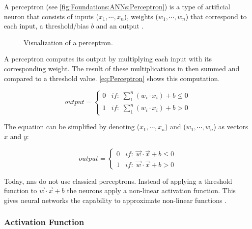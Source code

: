 A perceptron (see \autoref{fig:Foundations:ANNs:Perceptron}) is a type of artificial neuron that consists of inputs ($x_1, \cdots, x_n$), weights ($w_1, \cdots, w_n$) that correspond to each input, a threshold/bias $b$ and an output \cite{nielsen2015neural}.

\begin{figure}
    \centering
    \caption{Visualization of a perceptron.}
    \label{fig:Foundations:ANNs:Perceptron}
\end{figure}

A perceptron computes its output by multiplying each input with its corresponding weight. The result of these multiplications in then summed and compared to a threshold value. \autoref{eq:Perceptron} shows this computation.

\begin{equation}
    output = 
    \begin{cases}\label{eq:Perceptron}
    0 & if:\; \sum_{1}^{n}(w_i \cdot x_i) + b \le 0 \\
    1 & if:\; \sum_{1}^{n}(w_i \cdot x_i) + b > 0
    \end{cases}
\end{equation}

The equation can be simplified by denoting ($x_1, \cdots, x_n$) and ($w_1, \cdots, w_n$) as vectors $x$ and $y$:

\begin{equation}
    output = 
    \begin{cases}\label{eq:PerceptronVector}
    0 & if:\; \vec{w} \cdot \vec{x} + b \le 0 \\
    1 & if:\; \vec{w} \cdot \vec{x} + b > 0
    \end{cases}
\end{equation}

Today, \acp{nn} do not use classical perceptrons. Instead of applying a threshold function to $\vec{w} \cdot \vec{x} + b$ the neurons apply a non-linear activation function. This gives neural networks the capability to approximate non-linear functions \cite{cybenko1989approximation, hornik1991approximation, sharma2020activation}.

\subsubsection{Activation Function}
\label{sec:Foundations:NeuralNetworks:ActivationFunction}


